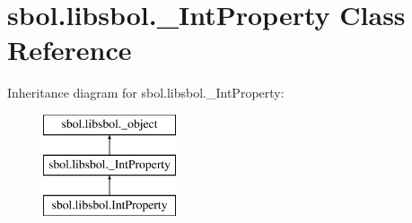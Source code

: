 \hypertarget{classsbol_1_1libsbol_1_1___int_property}{}\section{sbol.\+libsbol.\+\_\+\+Int\+Property Class Reference}
\label{classsbol_1_1libsbol_1_1___int_property}
Inheritance diagram for sbol.\+libsbol.\+\_\+\+Int\+Property\+:\begin{figure}[H]
\begin{center}
\leavevmode
\includegraphics[height=3.000000cm]{classsbol_1_1libsbol_1_1___int_property}
\end{center}
\end{figure}
